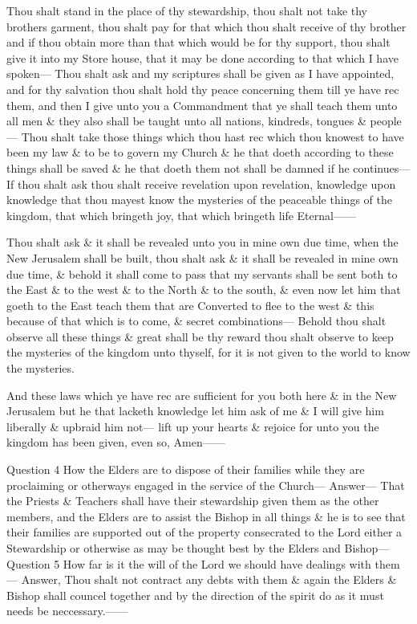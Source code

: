 			Thou shalt stand in the place of thy stewardship, thou shalt not take thy brothers garment, thou shalt pay for that which thou shalt receive of thy brother and if thou obtain more than that which would be for thy support, thou shalt give it into my Store house, that it may be done according to that which I have spoken--- Thou shalt ask and my scriptures shall be given as I have appointed, and for thy salvation thou shalt hold thy peace concerning them till ye have rec them, and then I give unto you a Commandment that ye shall teach them unto all men \& they also shall be taught unto all nations, kindreds, tongues \& people--- Thou shalt take those things which thou hast rec which thou knowest to have been my law \& to be to govern my Church \& he that doeth according to these things shall be saved \& he that doeth them not shall be damned if he continues--- If thou shalt ask thou shalt receive revelation upon revelation, knowledge upon knowledge that thou mayest know the mysteries of the peaceable things of the kingdom, that which bringeth joy, that which bringeth life Eternal------

			Thou shalt ask \& it shall be revealed unto you in mine own due time, when the New Jerusalem shall be built, thou shalt ask \& it shall be revealed in mine own due time, \& behold it shall come to pass that my servants shall be sent both to the East \& to the west \& to the North \& to the south, \& even now let him that goeth to the East teach them that are Converted to flee to the west \& this because of that which is to come, \& secret combinations--- Behold thou shalt observe all these things \& great shall be thy reward thou shalt observe to keep the mysteries of the kingdom unto thyself, for it is not given to the world to know the mysteries.

			And these laws which ye have rec are sufficient for you both here \& in the New Jerusalem but he that lacketh knowledge let him ask of me \& I will give him liberally \& upbraid him not--- lift up your hearts \& rejoice for unto you the kingdom has been given, even so, Amen------

			Question 4 How the Elders are to dispose of their families while they are proclaiming or otherways engaged in the service of the Church--- Answer--- That the Priests \& Teachers shall have their stewardship given them as the other members, and the Elders are to assist the Bishop in all things \& he is to see that their families are supported out of the property consecrated to the Lord either a Stewardship or otherwise as may be thought best by the Elders and Bishop--- Question 5 How far is it the will of the Lord we should have dealings with them--- Answer, Thou shalt not contract any debts with them \& again the Elders \& Bishop shall councel together and by the direction of the spirit do as it must needs be neccessary.------


